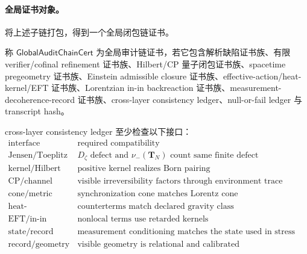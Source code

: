 \paragraph{全局证书对象。}
将上述子链打包，得到一个全局闭包链证书。

\begin{definition}[全局审计链证书]\label{def:typed-address-biaxial-completion-global-audit-chain-cert}
称 \(\mathsf{GlobalAuditChainCert}\) 为全局审计链证书，若它包含解析缺陷证书族、有限 verifier/cofinal refinement 证书族、Hilbert/CP 量子闭包证书族、spacetime pregeometry 证书族、Einstein admissible closure 证书族、effective-action/heat-kernel/EFT 证书族、Lorentzian in-in backreaction 证书族、measurement-decoherence-record 证书族、cross-layer consistency ledger、null-or-fail ledger 与 transcript hash。
\end{definition}

cross-layer consistency ledger 至少检查以下接口：
\[
\begin{array}{c|c}
\text{interface} & \text{required compatibility}\\
\hline
\text{Jensen/Toeplitz} & D_\zeta\text{ defect and }\nu_-(\mathbf T_N)\text{ count same finite defect}\\
\text{kernel/Hilbert} & \text{positive kernel realizes Born pairing}\\
\text{CP/channel} & \text{visible irreversibility factors through environment trace}\\
\text{cone/metric} & \text{synchronization cone matches Lorentz cone}\\
\text{heat-kernel/EFT} & \text{counterterms match declared gravity class}\\
\text{EFT/in-in} & \text{nonlocal terms use retarded kernels}\\
\text{state/record} & \text{measurement conditioning matches the state used in stress tensor}\\
\text{record/geometry} & \text{visible geometry is relational and calibrated}
\end{array}
\]

